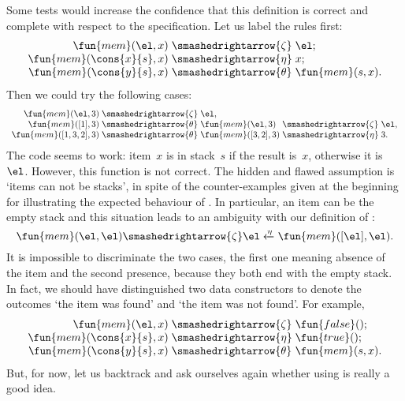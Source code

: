 Some tests would increase the confidence that this definition is
correct and complete with respect
to the specification. Let us label the rules first:
\begin{equation*}
\begin{array}{r@{\;}c@{\;}l}
\fun{mem}(\el,x)         & \smashedrightarrow{\zeta}  & \el;\\
\fun{mem}(\cons{x}{s},x) & \smashedrightarrow{\eta}   & x;\\
\fun{mem}(\cons{y}{s},x) & \smashedrightarrow{\theta} &
\fun{mem}(s,x).
\end{array}
\end{equation*}
Then we could try the following cases:
\begin{equation*}
\begin{array}{r@{\;}l@{\;}l@{\;}l@{\;}l}
\fun{mem}(\el,3) & \smashedrightarrow{\zeta} & \el,\\
\fun{mem}([1],3) & \smashedrightarrow{\theta} & \fun{mem}(\el,3)
& \smashedrightarrow{\zeta} & \el,\\
\fun{mem}([1,3,2],3) & \smashedrightarrow{\theta} & \fun{mem}([3,2],3)
& \smashedrightarrow{\eta} & 3.
\end{array}
\end{equation*}
The code seems to work: item~\(x\) is in stack~\(s\) if the result
is~\(x\), otherwise it is~\(\el\). However, this function is not
correct. The hidden and flawed assumption is `items
can not be stacks', in spite of the counter\hyp{}examples given at
the beginning for illustrating the expected behaviour of
. In particular, an item can be the empty stack and this
situation leads to an ambiguity with our definition of :
\begin{equation*}
  \fun{mem}(\el,\el) \smashedrightarrow{\zeta} \el \xleftarrow{\smash{\eta}} \fun{mem}([\el],\el).
\end{equation*}
It is impossible to discriminate the two cases, the first one meaning
absence of the item and the second presence, because they both end
with the empty stack. In fact, we should have distinguished two data
constructors to denote the outcomes `the item was found' and `the
item was not found'. For example,
\begin{equation*}
\begin{array}{r@{\;}l@{\;}l}
\fun{mem}(\el,x)         & \smashedrightarrow{\zeta}  & \fun{false}();\\
\fun{mem}(\cons{x}{s},x) & \smashedrightarrow{\eta}   & \fun{true}();\\
\fun{mem}(\cons{y}{s},x) & \smashedrightarrow{\theta} & \fun{mem}(s,x).
\end{array}
\end{equation*}
But, for now, let us backtrack and ask ourselves again whether using
 is really a good idea.

